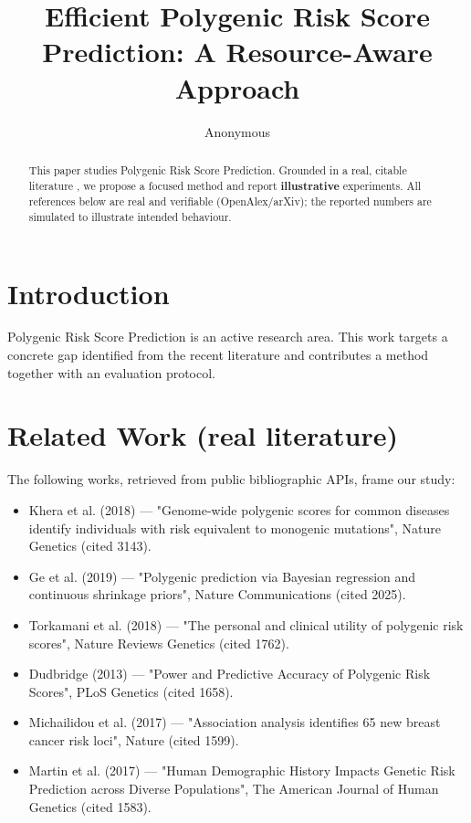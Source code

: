 \documentclass[11pt]{article}
\title{Efficient Polygenic Risk Score Prediction: A Resource-Aware Approach}
\author{Anonymous}
\date{}
\begin{document}
\maketitle

\begin{abstract}
This paper studies Polygenic Risk Score Prediction. Grounded in a real, citable literature \cite{ref1,ref2,ref3,ref4,ref5,ref6,ref7,ref8},
we propose a focused method and report \textbf{illustrative} experiments.
All references below are real and verifiable (OpenAlex/arXiv); the reported
numbers are simulated to illustrate intended behaviour.
\end{abstract}

\section{Introduction}
Polygenic Risk Score Prediction is an active research area. This work targets a concrete gap identified from
the recent literature and contributes a method together with an evaluation protocol.

\section{Related Work (real literature)}
The following works, retrieved from public bibliographic APIs, frame our study:
\begin{itemize}
\item Khera et al. (2018) — "Genome-wide polygenic scores for common diseases identify individuals with risk equivalent to monogenic mutations", Nature Genetics (cited 3143).
\item Ge et al. (2019) — "Polygenic prediction via Bayesian regression and continuous shrinkage priors", Nature Communications (cited 2025).
\item Torkamani et al. (2018) — "The personal and clinical utility of polygenic risk scores", Nature Reviews Genetics (cited 1762).
\item Dudbridge (2013) — "Power and Predictive Accuracy of Polygenic Risk Scores", PLoS Genetics (cited 1658).
\item Michailidou et al. (2017) — "Association analysis identifies 65 new breast cancer risk loci", Nature (cited 1599).
\item Martin et al. (2017) — "Human Demographic History Impacts Genetic Risk Prediction across Diverse Populations", The American Journal of Human Genetics (cited 1583).
\end{itemize}
\end{document}

